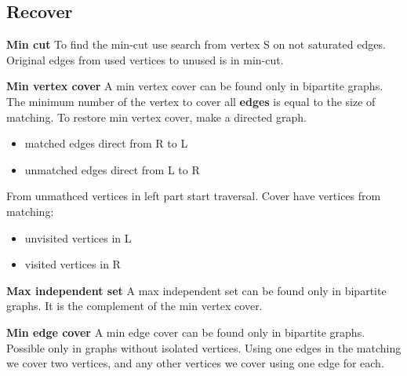 \subsection{Recover}
\textbf{Min cut}
To find the min-cut use search from vertex S on not saturated edges. 
Original edges from used vertices to unused is in min-cut.

\textbf{Min vertex cover}
A min vertex cover can be found only in bipartite graphs. 
The minimum number of the vertex to cover all \textbf{edges} is equal to the size of matching. 
To restore min vertex cover, make a directed graph.
\begin{itemize}
\setlength\itemsep{0em}
\item matched edges direct from R to L
\item unmatched edges direct from L to R
\end{itemize}

From unmathced vertices in left part start traversal.
Cover have vertices from matching:
\begin{itemize}
\setlength\itemsep{0em}
\item unvisited vertices in L 
\item visited vertices in R
\end{itemize}

\textbf{Max independent set}
A max independent set can be found only in bipartite graphs. 
It is the complement of the min vertex cover.

\textbf{Min edge cover}
A min edge cover can be found only in bipartite graphs. 
Possible only in graphs without isolated vertices. 
Using one edges in the matching we cover two vertices, 
and any other vertices we cover using one edge for each. 
